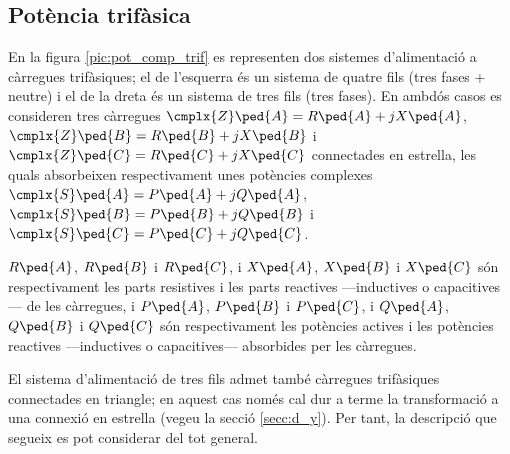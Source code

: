 \subsection{Potència trifàsica}  \label{sec:pot-trif}

En la figura \vref{pic:pot_comp_trif} es representen dos sistemes
d'alimentació a càrregues trifàsiques; el de l'esquerra és un
sistema de quatre fils (tres fases + neutre) i el de la dreta és un sistema
de tres fils (tres fases). En ambdós casos es consideren tres càrregues
$\cmplx{Z}\ped{A} = R\ped{A} + j X\ped{A}$, $\cmplx{Z}\ped{B}=
R\ped{B} + j X\ped{B}$ i $\cmplx{Z}\ped{C}= R\ped{C} + j X\ped{C}$
connectades en estrella, les quals absorbeixen respectivament unes
potències complexes $\cmplx{S}\ped{A} = P\ped{A} + j Q\ped{A}$,
$\cmplx{S}\ped{B}= P\ped{B} + j Q\ped{B}$ i $\cmplx{S}\ped{C}=
P\ped{C} + j Q\ped{C}$.

$R\ped{A}$, $R\ped{B}$ i $R\ped{C}$, i $X\ped{A}$, $X\ped{B}$ i
$X\ped{C}$ són respectivament les parts resistives i les parts
reactives ---inductives o capacitives--- de les càrregues, i $P\ped{A}$,
$P\ped{B}$ i $P\ped{C}$, i $Q\ped{A}$, $Q\ped{B}$ i $Q\ped{C}$ són
respectivament les potències actives i les potències reactives
---inductives o capacitives--- absorbides per les càrregues.

El sistema d'alimentació de tres fils admet també càrregues
trifàsiques connectades en triangle; en aquest cas només cal dur a
terme la transformació a una connexió en estrella (vegeu la secció
\ref{secc:d_y}). Per tant, la descripció que segueix es pot
considerar del tot general.

\begin{center}
    
    \label{pic:pot_comp_trif}
\end{center}

